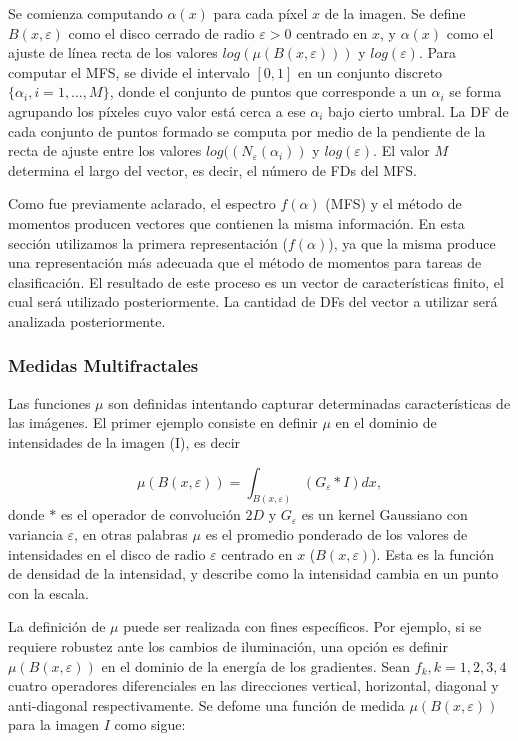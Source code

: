 Se comienza computando $\alpha(x)$ para cada píxel $x$ de la imagen.
Se define $B(x,\varepsilon)$ como el disco cerrado de radio $\varepsilon > 0$ centrado en $x$, y $\alpha(x)$ como el ajuste de línea recta de los valores $log(\mu(B(x,\varepsilon)))$ y $log(\varepsilon)$. 
Para computar el MFS, se divide el intervalo $[0,1]$ en un conjunto discreto $\{\alpha_{i}, i = 1,\dots,M\}$, donde el conjunto de puntos que corresponde a un $\alpha_{i}$ se forma agrupando los píxeles cuyo valor está cerca a ese $\alpha_{i}$ bajo cierto umbral. 
La DF de cada conjunto de puntos formado se computa por medio de la pendiente de la recta de ajuste entre los valores $log((N_{\varepsilon}(\alpha_{i}))$ y $log(\varepsilon)$. 
El valor $M$ determina el largo del vector, es decir, el número de FDs del MFS.

Como fue previamente aclarado, el espectro $f(\alpha)$ (MFS) y el método de momentos producen vectores que contienen la misma información.
En esta sección utilizamos la primera representación ($f(\alpha)$), ya que la misma produce una representación más adecuada que el método de momentos para tareas de clasificación.
El resultado de este proceso es un vector de características finito, el cual será utilizado posteriormente.
La cantidad de DFs del vector a utilizar será analizada posteriormente.


\subsubsection{Medidas Multifractales}
\label{sec:mfsmeasures}
Las funciones $\mu$ son definidas intentando capturar determinadas características de las imágenes.
El primer ejemplo consiste en definir $\mu$ en el dominio de intensidades de la imagen (I), es decir

\begin{equation}
\mu(B(x,\varepsilon)) = \int_{B(x,\varepsilon)}{(G_{\varepsilon} \ast I)} dx,
\label{eqn:eqn11}
\end{equation}
donde $\ast$ es el operador de convolución $2D$ y $G_{\varepsilon}$ es un kernel Gaussiano con variancia $\varepsilon$, en otras palabras $\mu$ es el promedio ponderado de los valores de intensidades en el disco de radio $\varepsilon$ centrado en $x$ ($B(x,\varepsilon)$).
Esta es la función de densidad de la intensidad, y describe como la intensidad cambia en un punto con la escala.

La definición de $\mu$ puede ser realizada con fines específicos.
Por ejemplo, si se requiere robustez ante los cambios de iluminación, una opción es definir$\mu(B(x,\varepsilon))$ en el dominio de la energía de los gradientes.
Sean ${ f_{k} , k = 1, 2, 3, 4}$ cuatro operadores diferenciales en las direcciones vertical, horizontal, diagonal y anti-diagonal respectivamente.
Se defome una función de medida $\mu(B(x,\varepsilon))$ para la imagen $I$ como sigue:

